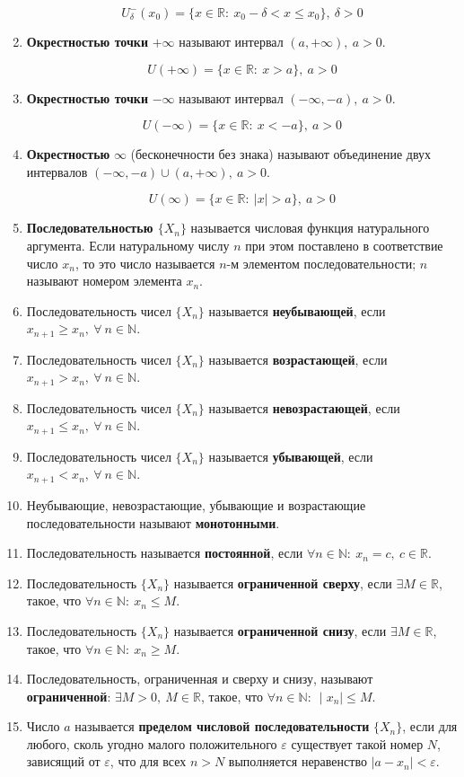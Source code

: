 \begin{enumerate}
$$U^-_{\delta}(x_0) = \{x \in \mathbb{R}: \ x_0 -\delta < x \leqslant x_0\},\ \delta > 0
    $$
\item \textbf{Окрестностью точки} $+\infty$ называют интервал $(a, +\infty), \ a > 0$.

$$U(+\infty) = \{x \in \mathbb{R}: \ x > a\}, \ a > 0
    $$
\item \textbf{Окрестностью точки} $-\infty$ называют интервал $(-\infty, -a), \ a > 0$.

$$U(-\infty) = \{x \in \mathbb{R}: \ x < -a\}, \ a > 0
    $$
\item \textbf{Окрестностью} $\infty$ (бесконечности без знака) называют объединение двух интервалов $(-\infty, -a) \cup (a, +\infty),\ a > 0$.

$$U(\infty) = \{x \in \mathbb{R}: \ | x | > a\}, \ a > 0
    $$
\item \textbf{Последовательностью $\{X_n\}$} называется числовая функция натурального аргумента. Если натуральному числу $n$ при этом поставлено в соответствие число $x_n$, то это число называется $n$-м элементом последовательности; $n$ называют номером элемента $x_n$.
\item Последовательность чисел $\{X_n\}$ называется \textbf{неубывающей}, если $x_{n+1}\geqslant x_n, \ \forall\ n \in \mathbb{N}$.
\item Последовательность чисел $\{X_n\}$ называется \textbf{возрастающей}, если $x_{n+1} > x_n, \ \forall\ n \in \mathbb{N}$.
\item Последовательность чисел $\{X_n\}$ называется \textbf{невозрастающей}, если $x_{n+1} \leqslant x_n, \ \forall\ n \in \mathbb{N}$.
\item Последовательность чисел $\{X_n\}$ называется \textbf{убывающей}, если $x_{n+1} < x_n, \ \forall\ n \in \mathbb{N}$.
\item Неубывающие, невозрастающие, убывающие и возрастающие последовательности называют \textbf{монотонными}.
\item Последовательность называется \textbf{постоянной}, если $ \forall n \in \mathbb{N}: \ x_n = c, \ c \in \mathbb{R}$.
\item Последовательность $\{X_n\}$ называется \textbf{ограниченной сверху}, если $\exists M \in \mathbb{R}$, такое, что $\forall n \in \mathbb{N}: \ x_n \leqslant M$.
\item Последовательность $\{X_n\}$ называется \textbf{ограниченной снизу}, если $\exists M \in \mathbb{R}$, такое, что $\forall n \in \mathbb{N}: \ x_n \geqslant M$.
\item Последовательность, ограниченная и сверху и снизу, называют \textbf{ограниченной}: $\exists M > 0, \ M \in \mathbb{R}$, такое, что $\forall n \in \mathbb{N}: \ \mid  x_n\mid   \leqslant M$.
\item Число $a$ называется \textbf{пределом числовой последовательности} $\{X_n\}$, если для любого, сколь угодно малого положительного ${\varepsilon}$ существует такой номер $N$, зависящий от ${\varepsilon}$, что для всех $n > N$ выполняется неравенство $\mid  a - x_n\mid   < {\varepsilon}$.


\end{enumerate}

